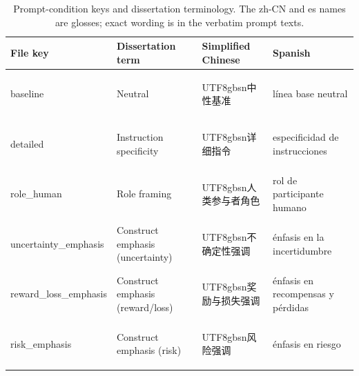 \documentclass[logo,msc,inf]{infthesis}       %
\begin{document}
\begin{table}[htbp]
\centering
\caption{Prompt-condition keys and dissertation terminology. The zh-CN and es names are glosses; exact wording is in the verbatim prompt texts.}
\label{tab:term-conditions}
\setlength{\tabcolsep}{4pt}%
\begin{tabular}{@{}>{\raggedright\arraybackslash}p{3.3cm}>{\raggedright\arraybackslash}p{3.0cm}>{\raggedright\arraybackslash}p{2.4cm}>{\raggedright\arraybackslash}p{3.2cm}@{}}
\toprule
\textbf{File key} & \textbf{Dissertation term} & \textbf{Simplified Chinese} & \textbf{Spanish} \\
\midrule
\footnotesize\ttfamily baseline & Neutral & {\begin{CJK}{UTF8}{gbsn}中性基准\end{CJK}} & l\'inea base neutral \\
\footnotesize\ttfamily detailed & Instruction specificity & {\begin{CJK}{UTF8}{gbsn}详细指令\end{CJK}} & especificidad de instrucciones \\
\footnotesize\ttfamily role\_human & Role framing & {\begin{CJK}{UTF8}{gbsn}人类参与者角色\end{CJK}} & rol de participante humano \\
\footnotesize\ttfamily uncertainty\_emphasis & Construct emphasis (uncertainty) & {\begin{CJK}{UTF8}{gbsn}不确定性强调\end{CJK}} & \'enfasis en la incertidumbre \\
\footnotesize\ttfamily reward\_loss\_emphasis & Construct emphasis (reward/loss) & {\begin{CJK}{UTF8}{gbsn}奖励与损失强调\end{CJK}} & \'enfasis en recompensas y p\'erdidas \\
\footnotesize\ttfamily risk\_emphasis & Construct emphasis (risk) & {\begin{CJK}{UTF8}{gbsn}风险强调\end{CJK}} & \'enfasis en riesgo \\
\bottomrule
\end{tabular}
\end{table}
\end{document}
